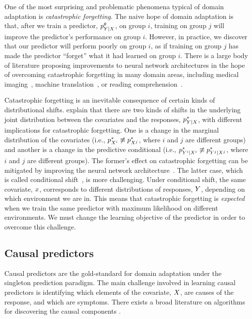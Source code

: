 \documentclass[../thesis.tex]{subfiles}
\begin{document}
One of the most surprising and problematic phenomena typical of domain adaptation is \textit{catastrophic forgetting}. The naive hope of domain adaptation is that, after we train a predictor, $\myfunc{p}^{\theta}_{\myrv{y} | \myrv{x}}$, on group $i$, training on group $j$ will improve the predictor's performance on group $i$. However, in practice, we discover that our predictor will perform poorly on group $i$, as if training on group $j$ has made the predictor ``forget'' what it had learned on group $i$. There is a large body of literature proposing improvements to neural network architectures in the hope of overcoming catastrophic forgetting in many domain areas, including medical imaging~\citep{perkoniggDynamicMemoryAlleviate2021}, machine translation~\citep{thompsonOvercomingCatastrophicForgetting2019}, or reading comprehension~\citep{xuForgetMeNot2020}.

Catastrophic forgetting is an inevitable consequence of certain kinds of distributional shifts. \citet{ben2010theory} explain that there are two kinds of shifts in the underlying joint distribution between the covariates and the responses, $\myfunc{p}^{*}_{\myrv{y} | \myrv{x}}$, with different implications for catastrophic forgetting. One is a change in the marginal distribution of the covariates (i.e., $\myfunc{p}^{*}_{\myrv{x}^i} \not\equiv \myfunc{p}^{*}_{\myrv{x}^j}$, where $i$ and $j$ are different groups) and another is a change in the predictive conditional (i.e., $\myfunc{p}^{*}_{\myrv{y}^i | \myrv{x}^i} \not\equiv \myfunc{p}^{*}_{\myrv{y}^j | \myrv{x}^j}$, where $i$ and $j$ are different groups). The former's effect on catastrophic forgetting can be mitigated by improving the neural network architecture~\citep{liuNeedLanguageDescribing2023}. The latter case, which is called conditional shift~\citep{liuNeedLanguageDescribing2023}, is more challenging. Under conditional shift, the same covariate, $x$, corresponds to different distributions of responses, $\myrv{y}$, depending on which environment we are in. This means that catastrophic forgetting is \textit{expected} when we train the same predictor with maximum likelihood on different environments. We must change the learning objective of the predictor in order to overcome this challenge.

\subsection{Causal predictors}
\label{sec:invariant-predictors}

Causal predictors are the gold-standard for domain adaptation under the singleton prediction paradigm. The main challenge involved in learning causal predictors is identifying which elements of the covariate, $\myrv{x}$, are causes of the response, and which are symptoms. There exists a broad literature on algorithms for discovering the causal components \citep{glymourReviewCausalDiscovery2019}.
\end{document}
